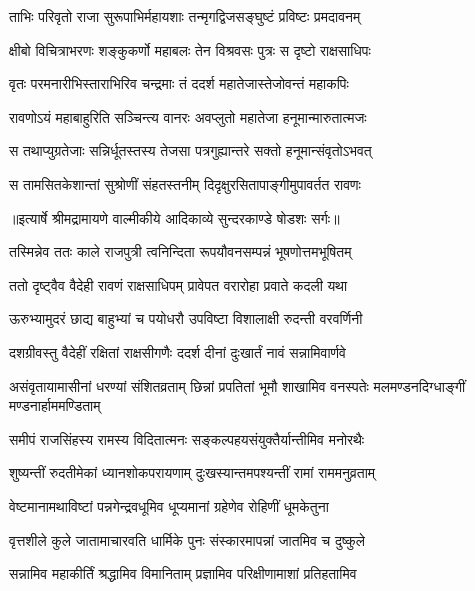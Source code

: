 \twolineshloka
{ताभिः परिवृतो राजा सुरूपाभिर्महायशाः}
{तन्मृगद्विजसङ्घुष्टं प्रविष्टः प्रमदावनम्} %

\twolineshloka
{क्षीबो विचित्राभरणः शङ्कुकर्णो महाबलः}
{तेन विश्रवसः पुत्रः स दृष्टो राक्षसाधिपः} %

\twolineshloka
{वृतः परमनारीभिस्ताराभिरिव चन्द्रमाः}
{तं ददर्श महातेजास्तेजोवन्तं महाकपिः} %

\twolineshloka
{रावणोऽयं महाबाहुरिति सञ्चिन्त्य वानरः}
{अवप्लुतो महातेजा हनूमान्मारुतात्मजः} %

\twolineshloka
{स तथाप्युग्रतेजाः सन्निर्धूतस्तस्य तेजसा}
{पत्रगुह्यान्तरे सक्तो हनूमान्संवृतोऽभवत्} %

\twolineshloka
{स तामसितकेशान्तां सुश्रोणीं संहतस्तनीम्}
{दिदृक्षुरसितापाङ्गीमुपावर्तत रावणः} %


{॥इत्यार्षे श्रीमद्रामायणे वाल्मीकीये आदिकाव्ये सुन्दरकाण्डे षोडशः सर्गः॥}


\twolineshloka
{तस्मिन्नेव ततः काले राजपुत्री त्वनिन्दिता}
{रूपयौवनसम्पन्नं भूषणोत्तमभूषितम्} %

\twolineshloka
{ततो दृष्ट्वैव वैदेही रावणं राक्षसाधिपम्}
{प्रावेपत वरारोहा प्रवाते कदली यथा} %

\twolineshloka
{ऊरुभ्यामुदरं छाद्य बाहुभ्यां च पयोधरौ}
{उपविष्टा विशालाक्षी रुदन्ती वरवर्णिनी} %

\twolineshloka
{दशग्रीवस्तु वैदेहीं रक्षितां राक्षसीगणैः}
{ददर्श दीनां दुःखार्तं नावं सन्नामिवार्णवे} %

\threelineshloka
{असंवृतायामासीनां धरण्यां संशितव्रताम्}
{छिन्नां प्रपतितां भूमौ शाखामिव वनस्पतेः}
{मलमण्डनदिग्धाङ्गीं मण्डनार्हाममण्डिताम्} %

\twolineshloka
{समीपं राजसिंहस्य रामस्य विदितात्मनः}
{सङ्कल्पहयसंयुक्तैर्यान्तीमिव मनोरथैः} %

\twolineshloka
{शुष्यन्तीं रुदतीमेकां ध्यानशोकपरायणाम्}
{दुःखस्यान्तमपश्यन्तीं रामां राममनुव्रताम्} %

\twolineshloka
{वेष्टमानामथाविष्टां पन्नगेन्द्रवधूमिव}
{धूप्यमानां ग्रहेणेव रोहिणीं धूमकेतुना} %

\twolineshloka
{वृत्तशीले कुले जातामाचारवति धार्मिके}
{पुनः संस्कारमापन्नां जातमिव च दुष्कुले} %

\twolineshloka
{सन्नामिव महाकीर्तिं श्रद्धामिव विमानिताम्}
{प्रज्ञामिव परिक्षीणामाशां प्रतिहतामिव} %

